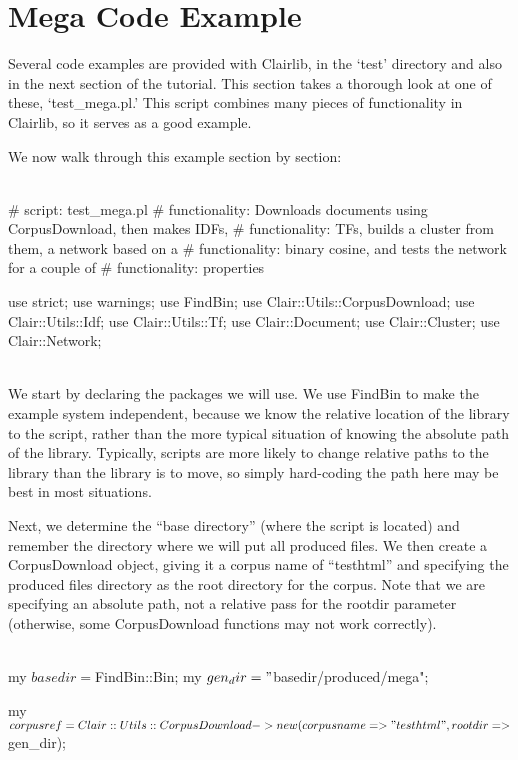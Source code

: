 \section{Mega Code Example}

Several code examples are provided with Clairlib, in the `test' directory
and also in the next section of the tutorial.  This section takes
a thorough look at one of these, `test\_mega.pl.'  This script
combines many pieces of functionality in Clairlib, so it serves as
a good example.

We now walk through this example section by section:
\\
\\
\begin{boxedverbatim}

# script: test_mega.pl
# functionality: Downloads documents using CorpusDownload, then makes IDFs,
# functionality: TFs, builds a cluster from them, a network based on a
# functionality: binary cosine, and tests the network for a couple of
# functionality: properties

use strict;
use warnings;
use FindBin;
use Clair::Utils::CorpusDownload;
use Clair::Utils::Idf;
use Clair::Utils::Tf;
use Clair::Document;
use Clair::Cluster;
use Clair::Network;

\end{boxedverbatim}
\\

We start by declaring the packages we will use.  We use FindBin
to make the example system independent, because we know the
relative location of the library to the script, rather than
the more typical situation of knowing the absolute path of the
library.  Typically, scripts
are more likely to change relative paths to the library than the
library is to move, so simply hard-coding the path here may be best
in most situations.

Next, we determine the ``base directory'' (where the script is located)
and remember the directory where we will put all produced files.  We
then create a CorpusDownload object, giving it a corpus name of ``testhtml''
and specifying the produced files directory as the root directory for the
corpus.  Note that we are specifying an absolute path, not a relative pass
for the rootdir parameter (otherwise, some CorpusDownload functions may not
work correctly).
\\
\\
\begin{boxedverbatim}

my $basedir = $FindBin::Bin;
my $gen_dir = "$basedir/produced/mega";

my $corpusref = Clair::Utils::CorpusDownload->new(corpusname => "testhtml",
                rootdir => $gen_dir);

\end{boxedverbatim}
\\

